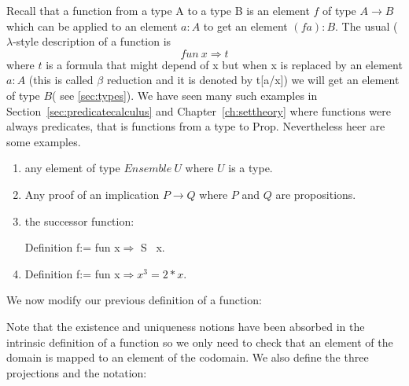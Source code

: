   Recall that a function from a type A to a type B is an element $f$ of type $A\rightarrow B$ which can be applied to an element $a:A$ to get an element $(f a):B$. The usual ($\lambda$-style description of a function is $$fun \ x \Rightarrow t$$ where $t$ is a formula that might depend of x but when x is replaced by an element $a:A$  (this is called $\beta$ reduction and it is  denoted by t[a/x]) we will get an element of type $B$( see \ref{sec:types}). We have seen many such examples in Section~\ref{sec:predicatecalculus} and  Chapter~\ref{ch:settheory}  where functions were always predicates, that is functions from a type to Prop. Nevertheless heer are some  examples.
  
  \begin{example}
  	
  	\begin{enumerate}\item any element of type $Ensemble\  U$ where $U$ is a type.
  		\item Any proof of an implication $P \rightarrow Q$ where $P$ and $Q$ are propositions.
  		

  		\item the successor function:
  		
  		{Definition f:= fun x$\Rightarrow$ S \ x.}
  		\item {Definition f:= fun x$\Rightarrow x^3=2*x$.}
  		  	\end{enumerate}   	
  \end{example}
  
  We now modify our previous definition of a function:


Note that the existence and uniqueness notions have been absorbed in the intrinsic definition of a function so we only need to check that an element of the domain is mapped to an element of the codomain. We also define the three projections and the notation:


